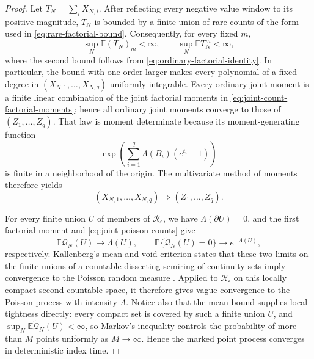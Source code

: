 \documentclass[11pt]{article}
\numberwithin{equation}{section}
\theoremstyle{definition}
\newcommand{\E}{\mathbb E}
\newcommand{\Pp}{\mathbb P}
\newcommand{\1}{\mathbf 1}
\begin{document}
\begin{proof}
Let \(T_N=\sum_iX_{N,i}\).  After reflecting every negative value
window to its positive magnitude, \(T_N\) is bounded by a finite union
of rare counts of the form used in \eqref{eq:rare-factorial-bound}.
Consequently, for every fixed \(m\),
\[
 \sup_N\E(T_N)_m<\infty,\qquad
 \sup_N\E T_N^m<\infty,
\]
where the second bound follows from
\eqref{eq:ordinary-factorial-identity}.  In particular, the bound with
one order larger makes every polynomial of a fixed degree in
\((X_{N,1},\ldots,X_{N,q})\) uniformly integrable.  Every ordinary
joint moment is a finite linear combination of the joint factorial
moments in \eqref{eq:joint-count-factorial-moments}; hence all ordinary
joint moments converge to those of \((Z_1,\ldots,Z_q)\).  That law is
moment determinate because its moment-generating function
\[
 \exp\left(\sum_{i=1}^q
       \Lambda(B_i)(e^{t_i}-1)\right)
\]
is finite in a neighborhood of the origin.  The multivariate method of
moments therefore yields
\begin{equation}\label{eq:joint-poisson-counts}
 (X_{N,1},\ldots,X_{N,q})
 \Longrightarrow (Z_1,\ldots,Z_q).
\end{equation}

For every finite union \(U\) of members of
\(\mathscr R_\varepsilon\), we have \(\Lambda(\partial U)=0\), and the
first factorial moment and
\eqref{eq:joint-poisson-counts} give
\[
 \E\widetilde{\mathcal Q}_N(U)\longrightarrow\Lambda(U),\qquad
 \Pp\{\widetilde{\mathcal Q}_N(U)=0\}
 \longrightarrow e^{-\Lambda(U)},
\]
respectively.  Kallenberg's mean-and-void criterion states that these
two limits on the finite unions of a countable dissecting semiring of
continuity sets imply convergence to the Poisson random measure
\cite[Theorem~4.7]{Kallenberg}.  Applied to
\(\mathscr R_\varepsilon\) on this locally compact second-countable
space, it therefore gives vague convergence to the Poisson process with
intensity \(\Lambda\).  Notice also that the mean
bound supplies local tightness directly: every compact set is covered
by such a finite union \(U\), and
\(\sup_N\E\widetilde{\mathcal Q}_N(U)<\infty\), so Markov's inequality
controls the probability of more than \(M\) points uniformly as
\(M\to\infty\).  Hence the marked point process converges in
deterministic index time.


\end{proof}
\end{document}
